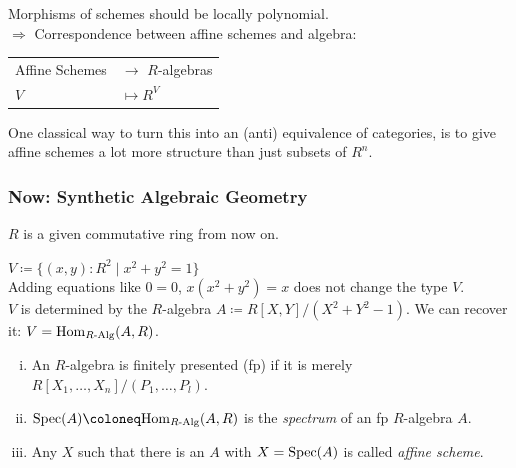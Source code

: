\documentclass{beamer}
\begin{document}
\begin{frame}
    
  Morphisms of schemes should be locally polynomial. \\
  \pause
  $\Rightarrow$ Correspondence between affine schemes and algebra: \\
  \pause
  \begin{center}
    \begin{tabular}{ll}
      Affine Schemes & $\to$ $R$-algebras \\
      $V$ & $\mapsto R^V$
    \end{tabular}
  \end{center}
  \pause
  One classical way to turn this into an (anti) equivalence of categories,
  is to give affine schemes a lot more structure than just subsets of $R^n$.
\end{frame}

\begin{frame}
  \frametitle{Now: \textbf{Synthetic} Algebraic Geometry}
  \pause
  $R$ is a given commutative ring from now on. \\
  \vspace{0.4cm}
  \pause

  $V\coloneq \{(x,y):R^2\mid x^2+y^2=1 \}$ \\

  \pause
  Adding equations like $0=0$, $x(x^2+y^2)=x$ does not change the type $V$. \\
  \pause
  $V$ is determined by the $R$-algebra $A\coloneq R[X,Y]/(X^2+Y^2-1)$.
  \pause
  We can recover it: $V=\mathrm{Hom}_{R\text{-}\mathrm{Alg}}(A,R)$. \\
  \vspace{0.4cm}
  \pause
  \begin{definition}
    \begin{enumerate}[(i)]
    \item An $R$-algebra is finitely presented (fp) if it is merely $R[X_1,\dots,X_n]/(P_1,\dots,P_l)$.
    \item $\Spec(A)\coloneq \Hom_{\Alg{R}}(A,R)$ is the \emph{spectrum} of an fp $R$-algebra $A$.
    \item Any $X$ such that there is an $A$ with $X=\operatorname{Spec}(A)$ is called \emph{affine scheme}.
    \end{enumerate}
  \end{definition}
\end{frame}
\end{document}
